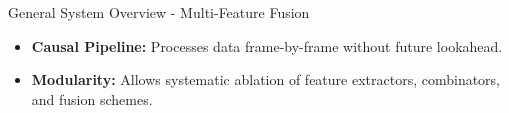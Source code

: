 \documentclass[8pt,hyperref={pdfpagelabels=true},xcolor=table,aspectratio=169]{beamer}
\begin{document}
\begin{frame}{General System Overview - Multi-Feature Fusion}
\begin{center}
    \end{center}
    \vspace{1.5em}
    \begin{itemize}
        \item \textbf{Causal Pipeline:} Processes data frame-by-frame without future lookahead.
        \item \textbf{Modularity:} Allows systematic ablation of feature extractors, combinators, and fusion schemes.
    \end{itemize}
\end{frame}
\end{document}
